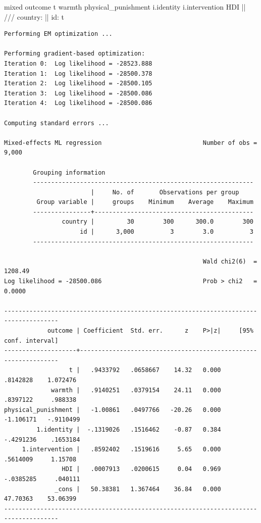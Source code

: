 \documentclass[
  letterpaper,
  DIV=11,
  numbers=noendperiod]{scrreprt}
\newenvironment{Shaded}{\begin{snugshade}}{\end{snugshade}}
\newcommand{\CommentTok}[1]{\textcolor[rgb]{0.37,0.37,0.37}{#1}}
\newcommand{\KeywordTok}[1]{\textcolor[rgb]{0.00,0.23,0.31}{#1}}
\newcommand{\NormalTok}[1]{\textcolor[rgb]{0.00,0.23,0.31}{#1}}
\begin{document}
\begin{Shaded}
\begin{Highlighting}[]
\NormalTok{mixed outcome t warmth physical\_punishment i.}\KeywordTok{identity}\NormalTok{ i.intervention HDI || }\CommentTok{/// }
\NormalTok{country: || id: t}
\end{Highlighting}
\end{Shaded}

\begin{verbatim}
Performing EM optimization ...

Performing gradient-based optimization: 
Iteration 0:  Log likelihood = -28523.888  
Iteration 1:  Log likelihood = -28500.378  
Iteration 2:  Log likelihood = -28500.105  
Iteration 3:  Log likelihood = -28500.086  
Iteration 4:  Log likelihood = -28500.086  

Computing standard errors ...

Mixed-effects ML regression                            Number of obs =   9,000

        Grouping information
        -------------------------------------------------------------
                        |     No. of       Observations per group
         Group variable |     groups    Minimum    Average    Maximum
        ----------------+--------------------------------------------
                country |         30        300      300.0        300
                     id |      3,000          3        3.0          3
        -------------------------------------------------------------

                                                       Wald chi2(6)  = 1208.49
Log likelihood = -28500.086                            Prob > chi2   =  0.0000

-------------------------------------------------------------------------------------
            outcome | Coefficient  Std. err.      z    P>|z|     [95% conf. interval]
--------------------+----------------------------------------------------------------
                  t |   .9433792   .0658667    14.32   0.000     .8142828    1.072476
             warmth |   .9140251   .0379154    24.11   0.000     .8397122     .988338
physical_punishment |   -1.00861   .0497766   -20.26   0.000    -1.106171   -.9110499
         1.identity |  -.1319026   .1516462    -0.87   0.384    -.4291236    .1653184
     1.intervention |   .8592402   .1519616     5.65   0.000     .5614009     1.15708
                HDI |   .0007913   .0200615     0.04   0.969    -.0385285     .040111
              _cons |   50.38381   1.367464    36.84   0.000     47.70363    53.06399
-------------------------------------------------------------------------------------


\end{verbatim}
\end{document}
